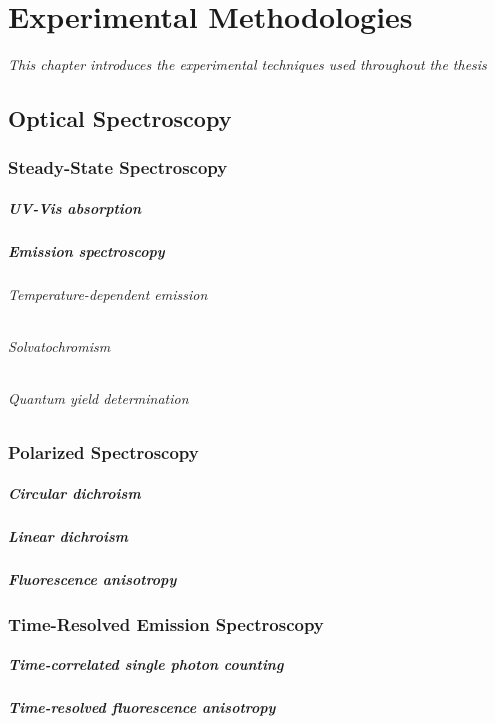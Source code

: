 \chapter{Experimental Methodologies}
\label{chap:Methodologies}
\textit{This chapter introduces the experimental techniques used throughout the thesis}
\vspace{2ex}\vfill
\minitoc
\newpage

\section{Optical Spectroscopy}
\subsection{Steady-State Spectroscopy}
\paragraph{UV-Vis absorption}
\paragraph{Emission spectroscopy}
\subparagraph{Temperature-dependent emission}
\subparagraph{Solvatochromism}
\subparagraph{Quantum yield determination}

\subsection{Polarized Spectroscopy}
\paragraph{Circular dichroism}
\paragraph{Linear dichroism}
\paragraph{Fluorescence anisotropy}

\subsection{Time-Resolved Emission Spectroscopy}
\paragraph{Time-correlated single photon counting}
\paragraph{Time-resolved fluorescence anisotropy}



